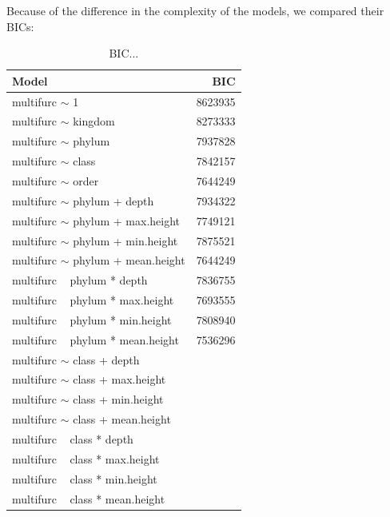         Because of the difference in the complexity of the models, we compared their BICs:
        \begin{table}
          \begin{center}
            \begin{tabular}{ |l|r| }
              \hline
              Model & BIC \\
              \hline \hline
              multifurc $\sim$ 1 & 8623935 \\
              multifurc $\sim$ kingdom & 8273333 \\
              multifurc $\sim$ phylum & 7937828 \\
              multifurc $\sim$ class & 7842157 \\
              \rowcolor{green!50}multifurc $\sim$ order & 7644249\\
              \hline \hline
              multifurc $\sim$ phylum + depth & 7934322 \\
              multifurc $\sim$ phylum + max.height & 7749121 \\
              multifurc $\sim$ phylum + min.height & 7875521 \\
              \rowcolor{green!50} multifurc $\sim$ phylum + mean.height & 7644249 \\
              \hline
              multifurc ~ phylum * depth & 7836755 \\
              multifurc ~ phylum * max.height & 7693555 \\
              multifurc ~ phylum * min.height & 7808940 \\
              \rowcolor{green!50} multifurc ~ phylum * mean.height & 7536296 \\
              \hline \hline
              multifurc $\sim$ class + depth & \\
              multifurc $\sim$ class + max.height & \\
              multifurc $\sim$ class + min.height & \\
              multifurc $\sim$ class + mean.height & \\
              \hline
              multifurc ~ class * depth & \\
              multifurc ~ class * max.height & \\
              multifurc ~ class * min.height & \\
              multifurc ~ class * mean.height &\\
              \hline
            \end{tabular} 
          \end{center}
          \caption{BIC...}
          \label{table:...} 
        \end{table}



